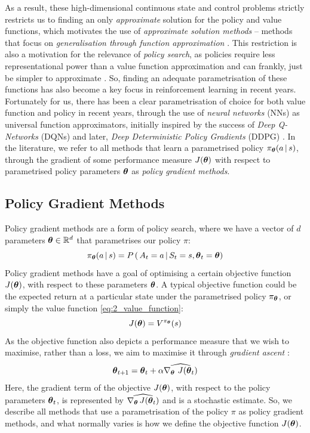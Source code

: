 As a result, these high-dimensional continuous state and control problems strictly restricts us to finding an only \textit{approximate} solution for the policy and value functions, which motivates the use of \textit{approximate solution methods} -- methods that focus on \textit{generalisation through function approximation} \cite{suttonAndBartoBook}.
This restriction is also a motivation for the relevance of \textit{policy search}, as policies require less representational power than a value function approximation \cite{BagnellPolicySearch2003} and can frankly, just be simpler to approximate \cite{suttonAndBartoBook}.
So, finding an adequate parametrisation of these functions has also become a key focus in reinforcement learning in recent years.
Fortunately for us, there has been a clear parametrisation of choice for both value function and policy in recent years, through the use of \textit{neural networks} (NNs) as universal function approximators, initially inspired by the success of \textit{Deep Q-Networks} (DQNs) \cite{DQN} and later, \textit{Deep Deterministic Policy Gradients} (DDPG) \cite{DDPG}.
In the literature, we refer to all methods that learn a parametrised policy $\pi_{\boldsymbol{\theta}} (a \, | \, s)$, through the gradient of some performance measure $J(\boldsymbol{\theta})$ with respect to parametrised policy parameters $\boldsymbol{\theta}$ as \textit{policy gradient methods}.  

\subsection{Policy Gradient Methods}
\label{subsec:2_policy_gradient_methods}
Policy gradient methods are a form of policy search, where we have a vector of $d$ parameters $\boldsymbol{\theta} \in \mathbb{R}^d$ that parametrises our policy $\pi$:
\begin{equation}
    \pi_{\boldsymbol{\theta}} (a \, | \, s) = P \, ( \, A_t = a \, | \, S_t = s, \boldsymbol{\theta}_t = \boldsymbol{\theta})
\end{equation}
Policy gradient methods have a goal of optimising a certain objective function $J(\boldsymbol{\theta})$, with respect to these parameters $\boldsymbol{\theta}$. A typical objective function could be the expected return at a particular state under the parametrised policy $\pi_{\boldsymbol{\theta}}$, or simply the value function \eqref{eq:2_value_function}:
\begin{equation}
    J(\boldsymbol{\theta}) = V^{\pi_{\boldsymbol{\theta}}}(s) \label{eq:2_2_JvalueFunc}
\end{equation}
As the objective function also depicts a performance measure that we wish to maximise, rather than a loss, we aim to maximise it through \textit{gradient ascent} \cite{suttonAndBartoBook}:
\begin{equation}
    \boldsymbol{\theta}_{t+1} = \boldsymbol{\theta}_t + \alpha \widehat{\nabla_{\boldsymbol{\theta}} \, \, J(\boldsymbol{\theta}_t)} \label{eq:2_2_gradientasc}
\end{equation}
Here, the gradient term of the objective $J(\boldsymbol{\theta})$, with respect to the policy parameters $\boldsymbol{\theta}_t$, is represented by $\widehat{\nabla_{\boldsymbol{\theta}} \, J(\boldsymbol{\theta}_t)}$ and is a stochastic estimate. So, we describe all methods that use a parametrisation of the policy $\pi$ as policy gradient methods, and what normally varies is how we define the objective function $J(\boldsymbol{\theta})$.

